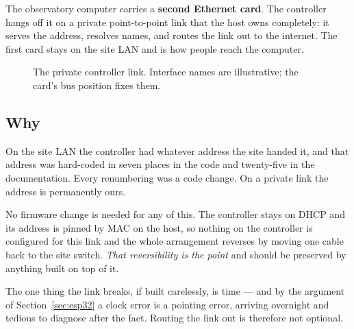 \documentclass[11pt,a4paper]{article}
\begin{document}
The observatory computer carries a \textbf{second Ethernet card}. The controller hangs off it on a private point-to-point link that the host owns completely: it serves the address, resolves names, and routes the link out to the internet. The first card stays on the site LAN and is how people reach the computer.

\begin{figure}[H]
\centering
{}
\caption{The private controller link. Interface names are illustrative; the card's bus position fixes them.}
\label{fig:network}
\end{figure}

\subsection{Why}

On the site LAN the controller had whatever address the site handed it, and that address was hard-coded in seven places in the code and twenty-five in the documentation. Every renumbering was a code change. On a private link the address is permanently ours.

No firmware change is needed for any of this. The controller stays on DHCP and its address is pinned by MAC on the host, so nothing on the controller is configured for this link and the whole arrangement reverses by moving one cable back to the site switch. \emph{That reversibility is the point} and should be preserved by anything built on top of it.

The one thing the link breaks, if built carelessly, is time --- and by the argument of Section~\ref{sec:esp32} a clock error is a pointing error, arriving overnight and tedious to diagnose after the fact. Routing the link out is therefore not optional.
\end{document}
